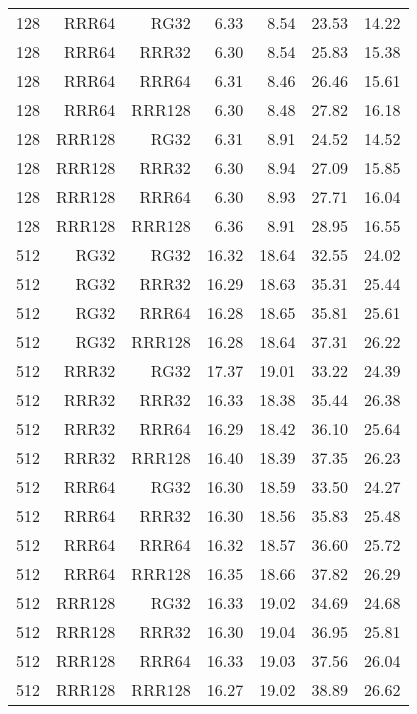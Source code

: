 \begin{table}
\begin{tabular}{|r|r|r|r|r|r|r|}
128 & RRR64 & RG32 & 6.33 & 8.54 & 23.53 & 14.22 \\
128 & RRR64 & RRR32 & 6.30 & 8.54 & 25.83 & 15.38 \\
128 & RRR64 & RRR64 & 6.31 & 8.46 & 26.46 & 15.61 \\
128 & RRR64 & RRR128 & 6.30 & 8.48 & 27.82 & 16.18 \\
128 & RRR128 & RG32 & 6.31 & 8.91 & 24.52 & 14.52 \\
128 & RRR128 & RRR32 & 6.30 & 8.94 & 27.09 & 15.85 \\
128 & RRR128 & RRR64 & 6.30 & 8.93 & 27.71 & 16.04 \\
128 & RRR128 & RRR128 & 6.36 & 8.91 & 28.95 & 16.55 \\
512 & RG32 & RG32 & 16.32 & 18.64 & 32.55 & 24.02 \\
512 & RG32 & RRR32 & 16.29 & 18.63 & 35.31 & 25.44 \\
512 & RG32 & RRR64 & 16.28 & 18.65 & 35.81 & 25.61 \\
512 & RG32 & RRR128 & 16.28 & 18.64 & 37.31 & 26.22 \\
512 & RRR32 & RG32 & 17.37 & 19.01 & 33.22 & 24.39 \\
512 & RRR32 & RRR32 & 16.33 & 18.38 & 35.44 & 26.38 \\
512 & RRR32 & RRR64 & 16.29 & 18.42 & 36.10 & 25.64 \\
512 & RRR32 & RRR128 & 16.40 & 18.39 & 37.35 & 26.23 \\
512 & RRR64 & RG32 & 16.30 & 18.59 & 33.50 & 24.27 \\
512 & RRR64 & RRR32 & 16.30 & 18.56 & 35.83 & 25.48 \\
512 & RRR64 & RRR64 & 16.32 & 18.57 & 36.60 & 25.72 \\
512 & RRR64 & RRR128 & 16.35 & 18.66 & 37.82 & 26.29 \\
512 & RRR128 & RG32 & 16.33 & 19.02 & 34.69 & 24.68 \\
512 & RRR128 & RRR32 & 16.30 & 19.04 & 36.95 & 25.81 \\
512 & RRR128 & RRR64 & 16.33 & 19.03 & 37.56 & 26.04 \\
512 & RRR128 & RRR128 & 16.27 & 19.02 & 38.89 & 26.62 \\
\hline
\end{tabular}
\end{table}

